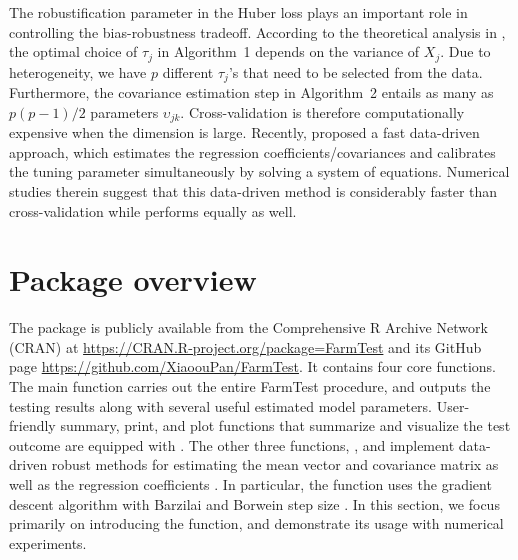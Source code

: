 The robustification parameter in the Huber loss plays an important role in controlling the bias-robustness tradeoff. According to the theoretical analysis in \cite{ZBFL2017}, the optimal choice of $\tau_j$ in Algorithm~1 depends on the variance of $X_j$.  Due to heterogeneity, we have $p$ different $\tau_j$'s that need to be selected from the data. Furthermore, the covariance estimation step in Algorithm~2 entails as many as $p(p-1)/2$ parameters $\upsilon_{jk}$. Cross-validation is therefore computationally expensive when the dimension is large.
Recently, \cite{KMRSZ2019} proposed a fast data-driven approach, which estimates the regression coefficients/covariances and calibrates the tuning parameter simultaneously by solving a system of equations. Numerical studies therein suggest that this data-driven method is considerably faster than cross-validation while performs equally as well. 





\section[Package overview]{Package overview}
\label{sec:overview}

The  package is publicly available from the Comprehensive R Archive Network (CRAN) at
\url{https://CRAN.R-project.org/package=FarmTest} and its GitHub page \url{https://github.com/XiaoouPan/FarmTest}.
It contains four core functions. The main function  carries out the entire FarmTest procedure, and outputs the testing results along with several useful estimated model parameters. User-friendly summary, print, and plot functions that summarize and visualize the test outcome are equipped with .
The other three functions, ,  and  implement data-driven robust methods for estimating the mean vector and covariance matrix \citep{KMRSZ2019} as well as the regression coefficients \citep{SZF2020}.
In particular, the  function uses the gradient descent algorithm with Barzilai and Borwein step size \citep{BB1988}.
In this section, we focus primarily on introducing the  function, and demonstrate its usage with numerical experiments.





